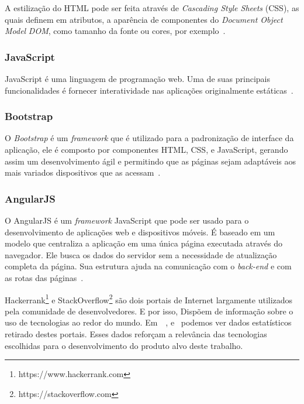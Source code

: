 A estilização do HTML pode ser feita através de \textit{Cascading Style Sheets} (CSS), as quais definem em atributos, a aparência de componentes do \textit{Document Object Model} \textit{DOM}, como tamanho da fonte ou cores, por exemplo~\cite{abreu2016desenvolvimento}.

\subsubsection{JavaScript}

JavaScript é uma linguagem de programação web.
Uma de suas principais funcionalidades é fornecer interatividade nas aplicações originalmente estáticas~\cite{de2016estudo}.

\subsubsection{Bootstrap}

O \textit{Bootstrap} é um \textit{framework} que é utilizado para a padronização de interface da aplicação, ele é composto por componentes HTML, CSS, e JavaScript, gerando assim um desenvolvimento ágil e permitindo que as páginas sejam adaptáveis aos mais variados dispositivos que as acessam~\cite{pereira2017ferramenta}. 

\subsubsection{AngularJS}

O AngularJS é um \textit{framework} JavaScript que pode ser usado para o desenvolvimento de aplicações web e dispositivos móveis.
É baseado em um modelo que centraliza a aplicação em uma única página executada através do navegador.
Ele busca os dados do servidor sem a necessidade de atualização completa da página.
Sua estrutura ajuda na comunicação com o \textit{back-end} e com as rotas das páginas~\cite{de2016estudo}.

Hackerrank\footnote{https://www.hackerrank.com} e StackOverflow\footnote{https://stackoverflow.com} são dois portais de Internet largamente utilizados pela comunidade de desenvolvedores. E por isso, Dispõem de informação sobre o uso de tecnologias ao redor do mundo.
Em~~, e~ podemos ver dados estatísticos retirado destes portais.
Esses dados reforçam a relevância das tecnologias escolhidas para o desenvolvimento do produto alvo deste trabalho.


